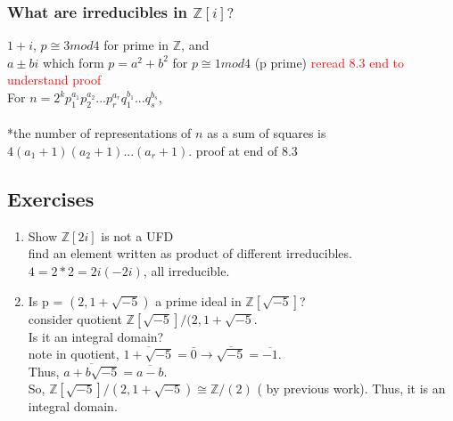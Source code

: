 \documentclass[12pt]{article}
\begin{document}
\subsubsection*{What are irreducibles in $\mathbb{Z}[i]?$}

$1 + i$, $p \cong 3 mod 4$ for prime in $\mathbb{Z}$, and \\
$a \pm bi$ which form $p = a^2 + b^2$ for $p \cong 1 mod 4$ (p prime)
\textcolor{red}{reread 8.3 end to understand proof}\\


For $n = 2^k p_1^{a_1} p_2^{a_2}...p_r^{a_r}q_1^{b_1}...q_s^{b_s}$, \\
\ \\
*the number of representations of $n$ as a sum of squares is\\ $4(a_1 + 1)(a_2 + 1)...(a_r + 1)$.
\textcolor[gray]{0.5}{proof at end of 8.3}



\subsection*{Exercises}
\begin{enumerate}
    \item Show $\mathbb{Z}[2i]$ is not a UFD\\
\textcolor[gray]{0.5}{find an element written as product of different irreducibles.\\
$4 = 2*2 = 2i(-2i)$, all irreducible.}
    \item Is p = $(2, 1 + \sqrt{-5})$ a prime ideal in $\mathbb{Z}[\sqrt{-5}]$?\\
\textcolor[gray]{0.5}{consider quotient $\mathbb{Z}[\sqrt{-5}] / (2, 1 + \sqrt{-5}$.\\
Is it an integral domain? \\
note in quotient, $\overline{1 + \sqrt{-5}} = \bar 0 \rightarrow \overline{\sqrt{-5}} = \overline{-1}.$\\
Thus, $\overline{a + b \sqrt{-5}} = \overline{a - b}$.\\
So, $\mathbb{Z}[\sqrt{-5}] / (2, 1 + \sqrt{-5}) \cong \mathbb{Z} / (2)$ ( by previous work).
Thus, it is an integral domain.
}
\end{enumerate}
\end{document}
